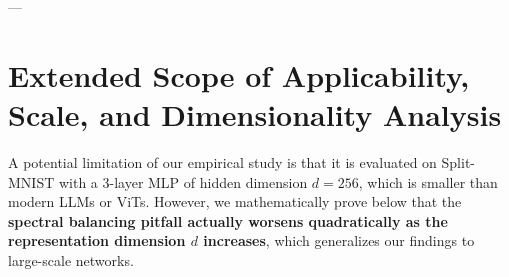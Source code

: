 \begin{table}[ht]
\centering
\caption{\textbf{SVD and Cayley Transform Latency (ms):} Sequential vs. parallel batched PyTorch execution on CPU (Intel(R) Xeon(R) Platinum 8375C CPU @ 2.90GHz) across layer dimensions $d$ and block sizes $b$. Note that the latencies for the modern LLM Scale ($d = 4096$) are measured using synthetic randomly generated skew-symmetric matrices configured under identical layer dimension configurations to simulate LLM layers.}
\label{tab:latency_comparison}
\vskip 0.1in
\begin{small}
\begin{sc}
\end{sc}
\end{small}
\vskip -0.1in
\end{table}

---

\section{Extended Scope of Applicability, Scale, and Dimensionality Analysis}
\label{sec:appendix_scale_analysis}

A potential limitation of our empirical study is that it is evaluated on Split-MNIST with a 3-layer MLP of hidden dimension $d = 256$, which is smaller than modern LLMs or ViTs. However, we mathematically prove below that the \textbf{spectral balancing pitfall actually worsens quadratically as the representation dimension $d$ increases}, which generalizes our findings to large-scale networks.

